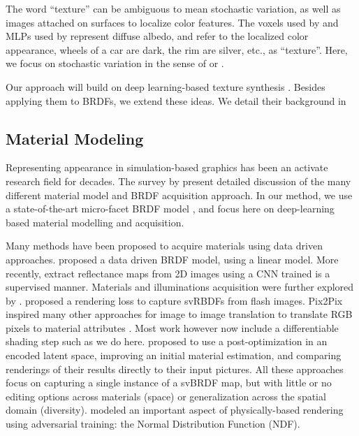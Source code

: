 \documentclass[acmtog, review, anonymous]{acmart}
\begin{document}
The word ``texture'' can be ambiguous to mean stochastic variation, as well as images attached on surfaces to localize color features.
The voxels used by \citet{zhu2018visual} and MLPs used by  \citet{oechsle2019texturefields} represent diffuse albedo, and refer to the localized color appearance, \eg wheels of a car are dark, the rim are silver, etc., as ``texture''.
Here, we focus on stochastic variation in the sense of \citet{julesz1965texture} or \citet{portilla2000parametric}.

Our approach will build on deep learning-based texture synthesis 
\cite{simonyan2014very,gatys2015texture,sendik2017deep,ulyanov2016texture,johnson2016perceptual,ulyanov2017improved,shaham2019singan,bergmann2017learning,zhou2018non,karras2019style}.
Besides applying them to BRDFs, we extend these ideas.
We detail their background in 

\subsection{Material Modeling}
Representing appearance in simulation-based graphics has been an activate research field for decades.
The survey by \citet{guarnera2016brdf} present detailed discussion of the many different material model and BRDF acquisition approach.
In our method, we use a state-of-the-art micro-facet BRDF model \cite{cook1982reflectance}, and focus here on deep-learning based material modelling and acquisition.

Many methods have been proposed to acquire materials using data driven approaches.
\citet{matusik2003data} proposed a data driven BRDF model, using a linear model. More recently, \citet{rematas2016deep} extract reflectance maps from 2D images using a CNN trained is a supervised manner. Materials and illuminations acquisition were further explored by \citet{georgoulis2017reflectance}.
\citet{deschaintre2018single} proposed a rendering loss to capture svRBDFs from flash images.
Pix2Pix \cite{pix2pix2016} inspired many other approaches for image to image translation to translate RGB pixels to material attributes \cite{li2018learning,li2017modeling,li2018materials}.
Most work however now include a differentiable shading step \cite{liu2017material,li2018learning,deschaintre2018single, deschaintre2019flexible,guo2020materialgan} such as we do here.
\citet{gao2019deep} proposed to use a post-optimization in an encoded latent space, improving an initial material estimation, and comparing renderings of their results directly to their input pictures.
All these approaches focus on capturing a single instance of a \ac{svBRDF} map, but with little or no editing options across materials (space) or generalization across the spatial domain (diversity).
\citet{kuznetsov2019learning} modeled an important aspect of physically-based rendering using adversarial training: the Normal Distribution Function (NDF).
\end{document}
